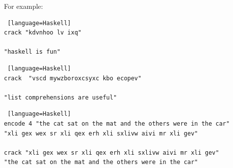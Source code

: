 \documentclass[11pt]{article}
\def\frametitle#1{}
\begin{document}
%
 \begin{frame} [fragile]
    \frametitle{Cracking the Code contd.}
For example:
  \begin{onlyenv}
  \begin{lstlisting} [language=Haskell]
crack "kdvnhoo lv ixq"

"haskell is fun"

\end{lstlisting}
 \end{onlyenv}    

 \begin{onlyenv}
  \begin{lstlisting} [language=Haskell]
crack  "vscd mywzboroxcsyxc kbo ecopev" 

"list comprehensions are useful"

\end{lstlisting}
 \end{onlyenv}    



\begin{onlyenv}
 \begin{lstlisting} [language=Haskell]
encode 4 "the cat sat on the mat and the others were in the car"
"xli gex wex sr xli qex erh xli sxlivw aivi mr xli gev"

crack "xli gex wex sr xli qex erh xli sxlivw aivi mr xli gev"
"the cat sat on the mat and the others were in the car"
\end{lstlisting}
\end{onlyenv}    
\end{frame}
\medskip
 
\printbibliography
\end{document}
